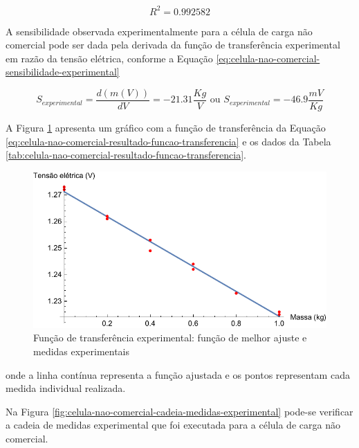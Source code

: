 \documentclass[a4paper]{instrumentacao}
\begin{document}
\begin{equation}
	R^2 = 0.992582
	\label{eq:celula-nao-comercial-resultado-funcao-transferencia-r2}
\end{equation}

A sensibilidade observada experimentalmente para a célula de carga não comercial pode ser dada pela derivada da função de transferência experimental em razão da tensão elétrica, conforme a Equação \ref{eq:celula-nao-comercial-sensibilidade-experimental}

\begin{equation}
	S_{experimental}=\frac{d (m(V))}{d V }=-21.31\frac{Kg}{V} \textrm{ ou } S_{experimental}=-46.9\frac{mV}{Kg}
	\label{eq:celula-nao-comercial-sensibilidade-experimental}
\end{equation}

A Figura \ref{fig:celula-nao-comercial-resultado-funcao-transferencia} apresenta um gráfico com a função de transferência da Equação \ref{eq:celula-nao-comercial-resultado-funcao-transferencia} e os dados da Tabela \ref{tab:celula-nao-comercial-resultado-funcao-transferencia}.

\begin{figure}[H]
\center
\includegraphics[width=\textwidth]{NaoComercial-Plot.pdf}
\caption{Função de transferência experimental: função de melhor ajuste e medidas experimentais}
\label{fig:celula-nao-comercial-resultado-funcao-transferencia}
\end{figure}

\noindent onde a linha contínua representa a função ajustada e os pontos representam cada medida individual realizada.

Na Figura \ref{fig:celula-nao-comercial-cadeia-medidas-experimental} pode-se verificar a cadeia de medidas experimental que foi executada para a célula de carga não comercial. 
\end{document}
